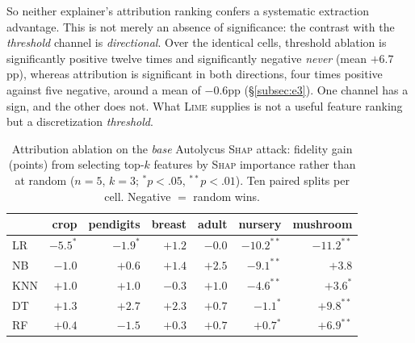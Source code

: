 \documentclass[sigconf,anonymous,review]{acmart}
\begin{document}
So neither explainer's attribution ranking confers a systematic extraction advantage. This is not
merely an absence of significance: the contrast with the \emph{threshold} channel is \emph{directional}.
Over the identical cells, threshold ablation is significantly positive twelve times and significantly
negative \emph{never} (mean $+6.7$pp), whereas attribution is significant in both directions, four
times positive against five negative, around a mean of $-0.6$pp (\S\ref{subsec:e3}). One channel has a sign, and the other does not.
What \textsc{Lime} supplies is not a useful feature ranking but a discretization \emph{threshold}.

\begin{table}[t]
\centering
\caption{Attribution ablation on the \emph{base} Autolycus \textsc{Shap} attack: fidelity gain
(points) from selecting top-$k$ features by \textsc{Shap} importance rather than at random ($n{=}5$,
$k{=}3$; $^{*}p{<}.05$, $^{**}p{<}.01$). Ten paired splits per cell. Negative $=$ random wins.}
\label{tab:shap-attr}
\setlength{\tabcolsep}{3pt}
\begin{tabular}{lrrrrrr}
\toprule
 & crop & pendigits & breast & adult & nursery & mushroom \\
\midrule
LR  & $-5.5^{*}$ & $-1.9^{*}$  & $+1.2$ & $-0.0$ & $-10.2^{**}$ & $-11.2^{**}$ \\
NB  & $-1.0$     & $+0.6$      & $+1.4$ & $+2.5$ & $-9.1^{**}$  & $+3.8$ \\
KNN & $+1.0$     & $+1.0$      & $-0.3$ & $+1.0$ & $-4.6^{**}$  & $+3.6^{*}$ \\
DT  & $+1.3$     & $+2.7$      & $+2.3$ & $+0.7$ & $-1.1^{*}$   & $+9.8^{**}$ \\
RF  & $+0.4$     & $-1.5$      & $+0.3$ & $+0.7$ & $+0.7^{*}$   & $+6.9^{**}$ \\
\bottomrule
\end{tabular}
\end{table}
\end{document}
